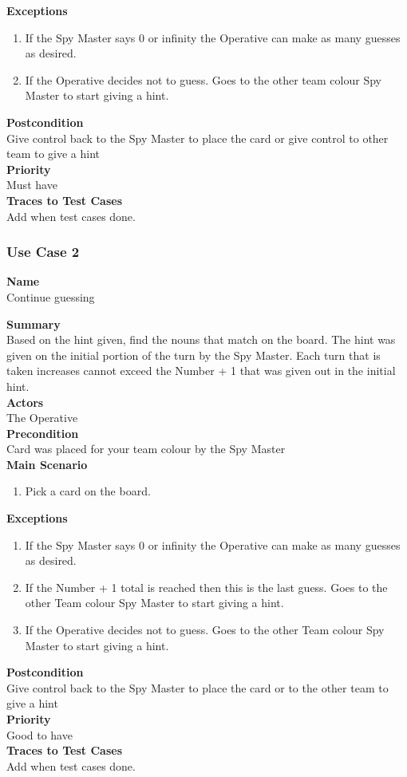 \documentclass[12pt]{article}
\begin{document}
\noindent
{\bf Exceptions}
\begin{enumerate}
\item If the Spy Master says 0 or infinity the Operative can make as many guesses as desired.
\item If the Operative decides not to guess. Goes to the other team colour Spy Master to start giving a hint.
\end{enumerate}

\noindent
{\bf Postcondition}\\
Give control back to the Spy Master to place the card or give control to other team to give a hint\\
\noindent
{\bf Priority}\\
Must have\\
\noindent
{\bf Traces to Test Cases}\\
Add when test cases done.

\newpage
\subsubsection{Use Case 2} \label{uc:2}

\noindent
{\bf Name}\\
Continue guessing

\noindent
{\bf Summary}\\
Based on the hint given, find the nouns that match on the board. The hint was given on the initial portion of the turn by the Spy Master. Each turn that is taken increases cannot exceed the Number + 1 that was given out in the initial hint.\\
\noindent
{\bf Actors}\\
The Operative\\
\noindent
{\bf Precondition}\\
Card was placed for your team colour by the Spy Master\\
\noindent
{\bf Main Scenario}\\
\vspace*{-0.2in}
\begin{enumerate}
\item Pick a card on the board.
\end{enumerate}

\noindent
{\bf Exceptions}
\begin{enumerate}
\item If the Spy Master says 0 or infinity the Operative can make as many guesses as desired.
\item If the Number + 1 total is reached then this is the last guess. Goes to the other Team colour Spy Master to start giving a hint.
\item If the Operative decides not to guess. Goes to the other Team colour Spy Master to start giving a hint.
\end{enumerate}
\noindent
{\bf Postcondition}\\
Give control back to the Spy Master to place the card or to the other team to give a hint\\
\noindent
{\bf Priority}\\
Good to have\\
\noindent
{\bf Traces to Test Cases}\\
Add when test cases done.
\newpage
\end{document}
